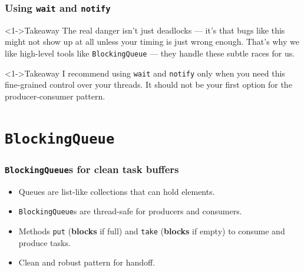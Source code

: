\documentclass[xcolor={dvipsnames,svgnames},aspectratio=169]{beamer}
\begin{document}
\begin{frame}[fragile]
  \frametitle{Using \texttt{wait} and \texttt{notify}}
  \begin{block}<1->{\faBook \quad Takeaway}
    The real danger isn’t just deadlocks --- it’s that bugs like this might not
    show up at all unless your timing is just wrong enough. That’s why we like
    high-level tools like \texttt{BlockingQueue} --- they handle these subtle
    races for us.
  \end{block}
  \vspace{0.4cm}
  \begin{block}<1->{\faBook \quad Takeaway}
    I recommend using \texttt{wait} and \texttt{notify} only when you need this
    fine-grained control over your threads. It should not be your first option
    for the producer-consumer pattern.
  \end{block}

\end{frame}

\section{\texttt{BlockingQueue}}

\begin{frame}[fragile]
  \frametitle{\texttt{BlockingQueue}s for clean task buffers}

  \begin{itemize}
  \item[\faBook] Queues are list-like collections that can hold elements.
  \item[\faBook] \texttt{BlockingQueue}s are thread-safe for producers and
    consumers.
  \item[\faBook] Methods \texttt{put} (\textbf{blocks} if full) and
    \texttt{take} (\textbf{blocks} if empty) to consume and produce
    tasks.
  \item[\faBook]  Clean and robust pattern for handoff.
  \end{itemize}
\end{frame}
\end{document}
